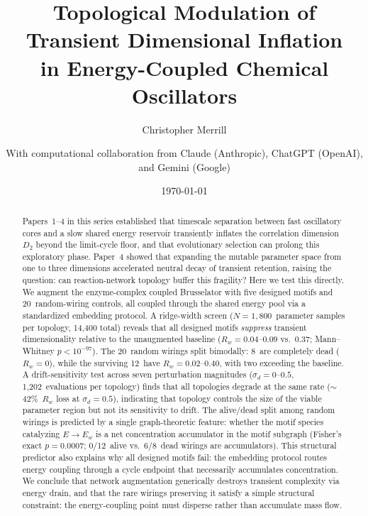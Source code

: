 \documentclass[twocolumn,showpacs,preprintnumbers,amsmath,amssymb,prd,floatfix]{revtex4-2}
\newcommand{\Dtwo}{D_2}
\newcommand{\Rw}{R_w}
\renewcommand{\sd}{\sigma_d}
\begin{document}
\title{Topological Modulation of Transient Dimensional Inflation\\
in Energy-Coupled Chemical Oscillators}

\author{Christopher Merrill}
\author{With computational collaboration from Claude (Anthropic), ChatGPT (OpenAI), and Gemini (Google)}

\date{\today}

\begin{abstract}
Papers~1--4 in this series established that timescale separation between fast oscillatory cores and a slow shared energy reservoir transiently inflates the correlation dimension $\Dtwo$ beyond the limit-cycle floor, and that evolutionary selection can prolong this exploratory phase. Paper~4 showed that expanding the mutable parameter space from one to three dimensions accelerated neutral decay of transient retention, raising the question: can reaction-network topology buffer this fragility? Here we test this directly. We augment the enzyme-complex coupled Brusselator with five designed motifs and 20~random-wiring controls, all coupled through the shared energy pool via a standardized embedding protocol. A ridge-width screen ($N = 1{,}800$~parameter samples per topology, 14{,}400 total) reveals that all designed motifs \textit{suppress} transient dimensionality relative to the unaugmented baseline ($\Rw = 0.04$--$0.09$ vs.\ $0.37$; Mann--Whitney $p < 10^{-97}$). The 20~random wirings split bimodally: 8~are completely dead ($\Rw = 0$), while the surviving 12~have $\Rw = 0.02$--$0.40$, with two exceeding the baseline. A drift-sensitivity test across seven perturbation magnitudes ($\sd = 0$--$0.5$, 1{,}202~evaluations per topology) finds that all topologies degrade at the same rate ($\sim$42\%~$\Rw$ loss at $\sd = 0.5$), indicating that topology controls the size of the viable parameter region but not its sensitivity to drift. The alive/dead split among random wirings is predicted by a single graph-theoretic feature: whether the motif species catalyzing $E \to E_w$ is a net concentration accumulator in the motif subgraph (Fisher's exact $p = 0.0007$; 0/12~alive vs.\ 6/8~dead wirings are accumulators). This structural predictor also explains why all designed motifs fail: the embedding protocol routes energy coupling through a cycle endpoint that necessarily accumulates concentration. We conclude that network augmentation generically destroys transient complexity via energy drain, and that the rare wirings preserving it satisfy a simple structural constraint: the energy-coupling point must disperse rather than accumulate mass flow.
\end{abstract}
\end{document}
